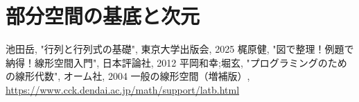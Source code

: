 \documentclass[../../topic_linear-algebra]{subfiles}
\begin{document}
\chapter{部分空間の基底と次元}








\sectionline
\begin{thebibliography}{9}
   池田岳, "行列と行列式の基礎", 東京大学出版会, 2025
   梶原健, "図で整理！例題で納得！線形空間入門", 日本評論社, 2012
   平岡和幸;堀玄, "プログラミングのための線形代数", オーム社, 2004
   一般の線形空間（増補版）, \url{https://www.cck.dendai.ac.jp/math/support/latb.html}
\end{thebibliography}
\end{document}

